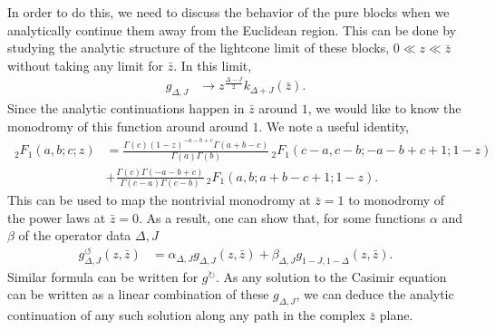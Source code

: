 In order to do this, we need to discuss the behavior of the pure blocks when we analytically continue them away from the Euclidean region.
This can be done by studying the analytic structure of the lightcone limit of these blocks, $ 0 \ll z \ll \bar{z}  $ without taking any limit for $ \bar{z} $.
In this limit,
\begin{align}
  g_{\Delta,J} & \rightarrow z^{\frac{\Delta-J}{2}} k_{\Delta+J}\left( \bar{z} \right)
  .\end{align}
Since the analytic continuations happen in $ \bar{z} $ around $ 1 $, we would like to know the monodromy of this function around around $ 1 $.
We note a useful identity,
\begin{align}
  \, _2F_1(a,b;c;z) & =\frac{\Gamma (c) (1-z)^{-a-b+c} \Gamma (a+b-c) }{\Gamma (a) \Gamma (b)}
  \,
  _2F_1(c-a,c-b;-a-b+c+1;1-z) \nonumber                                                        \\
                    & +\frac{\Gamma
    (c) \Gamma (-a-b+c) }{\Gamma (c-a) \Gamma
    (c-b)}\, _2F_1(a,b;a+b-c+1;1-z)
  .\end{align}
This can be used to map the nontrivial monodromy at $ \bar{z} = 1 $ to monodromy of the power laws at $ \bar{z} = 0 $.
As a result, one can show that, for some functions $ \alpha $ and $ \beta $ of the operator data $ \Delta,J $
\begin{align}
  \label{eq:analyticContinuationOfgpure}
  g^{\circlearrowleft}_{\Delta,J}\left( z,\bar{z} \right) & = \alpha_{\Delta,J} g_{\Delta,J}\left( z,\bar{z} \right) + \beta_{\Delta,J} g_{1-J,1-\Delta} \left( z,\bar{z} \right)
  .\end{align}
Similar formula can be written for $ g^{\circlearrowright} $.
As any solution to the Casimir equation can be written as a linear combination of these $ g_{\Delta,J} $, we can deduce the analytic continuation of any such solution along any path in the complex $ \bar{z} $ plane.




